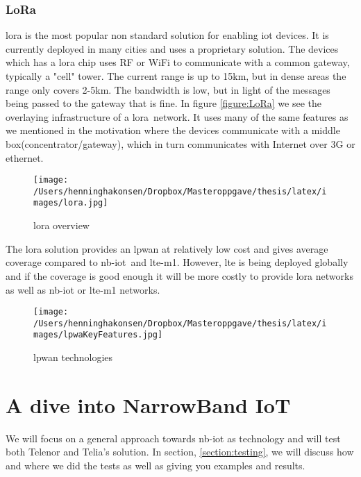 \documentclass[USenglish]{ifimaster}  %
\begin{document}
\subsection{LoRa}
\acrshort{lora} \cite{online:LoRa} is the most popular non standard solution for enabling \acrshort{iot} devices. It is currently deployed in many cities and uses a proprietary solution. The devices which has a \acrshort{lora} chip uses RF or WiFi to communicate with a common gateway, typically a "cell" tower. The current range is up to 15km, but in dense areas the range only covers 2-5km. The bandwidth is low, but in light of the messages being passed to the gateway that is fine. In figure \vref{figure:LoRa} we see the overlaying infrastructure of a \acrshort{lora} network. It uses many of the same features as we mentioned in the motivation where the devices communicate with a middle box(concentrator/gateway), which in turn communicates with Internet over 3G or ethernet.

\begin{figure}[ht]
  \centering\texttt{[image: /Users/henninghakonsen/Dropbox/Masteroppgave/thesis/latex/images/lora.jpg]}
  \caption[\acrshort{lora} overview]{\acrshort{lora} overview \cite{online:LoRa}}
  \label{figure:LoRa}
\end{figure}

The \acrshort{lora} solution provides an \acrshort{lpwan} at relatively low cost and gives average coverage compared to \acrshort{nb-iot} and \acrshort{lte-m1}. However, \acrshort{lte} is being deployed globally and if the coverage is good enough it will be more costly to provide \acrshort{lora} networks as well as \acrshort{nb-iot} or \acrshort{lte-m1} networks.

\begin{figure}[ht]
  \centering\texttt{[image: /Users/henninghakonsen/Dropbox/Masteroppgave/thesis/latex/images/lpwaKeyFeatures.jpg]}
  \caption[\acrshort{lpwan} technologies]{\acrshort{lpwan} technologies \cite{online:legacyWire}}
  \label{figure:legacyWire}
\end{figure}

\chapter{A dive into NarrowBand IoT} \label{section:nb-iot}
We will focus on a general approach towards \acrshort{nb-iot} as technology and will test both Telenor and Telia's solution. In section, \vref{section:testing}, we will discuss how and where we did the tests as well as giving you examples and results.
\end{document}
